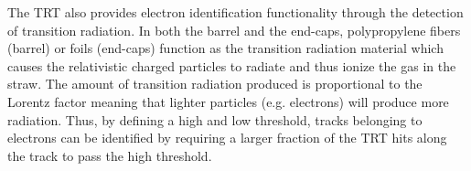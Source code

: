 The TRT also provides electron identification functionality through the
detection of transition radiation.  In both the barrel and the end-caps,
polypropylene fibers (barrel) or foils (end-caps) function as the transition
radiation material which causes the relativistic charged particles to radiate
and thus ionize the gas in the straw.  The amount of transition radiation
produced is proportional to the Lorentz factor meaning that lighter particles
(e.g. electrons) will produce more radiation.  Thus, by defining a high and low
threshold, tracks belonging to electrons can be identified by requiring a
larger fraction of the TRT hits along the track to pass the high threshold.
